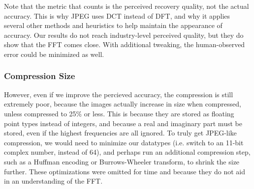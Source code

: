		Note that the metric that counts is the perceived recovery quality, not the actual accuracy. This is why JPEG uses DCT instead of DFT, and why it applies several other methods and heuristics to help maintain the appearance of accuracy. Our results do not reach industry-level perceived quality, but they do show that the FFT comes close. With additional tweaking, the human-observed error could be minimized as well.
	\subsubsection{Compression Size}
		However, even if we improve the percieved accuracy, the compression is still extremely poor, because the images actually increase in size when compressed, unless compressed to 25\% or less. This is because they are stored as floating point types instead of integers, and because a real and imaginary part must be stored, even if the highest frequencies are all ignored. To truly get JPEG-like compression, we would need to minimize our datatypes (i.e. switch to an 11-bit complex number, instead of 64), and perhaps run an additional compression step, such as a Huffman encoding or Burrows-Wheeler transform, to shrink the size further. These optimizations were omitted for time and because they do not aid in an understanding of the FFT.
